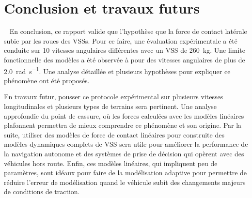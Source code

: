 \section{Conclusion et travaux futurs}~\label{sec:conclu}
En conclusion, ce rapport valide que l'hypothèse que la force de contact latérale subie par les roues des \acp{VSS}.
Pour ce faire, une évaluation expérimentale a été conduite sur 10 vitesses angulaires différentes avec un \ac{VSS} de \SI{260}{\kg}.
Une limite fonctionnelle des modèles a été observée à pour des vitesses angulaires de plus de \SI{2.0}{\radian\per\second}.
Une analyse détaillée et plusieurs hypothèses pour expliquer ce phénomène ont été proposés.

En travaux futur, pousser ce protocole expérimental sur plusieurs vitesses longitudinales et plusieurs types de terrains sera pertinent.
Une analyse approfondie du point de cassure, où les forces calculées avec les modèles linéaires plafonnent permettra de mieux comprendre ce phénomène et son origine.
Par la suite, utiliser des modèles de force de contact linéaires pour construite des modèles dynamiques complets de \ac{VSS} sera utile pour améliorer la performance de la navigation autonome et des systèmes de prise de décision qui opèrent avec des véhicules hors route.
Enfin, ces modèles linéaires, qui impliquent peu de paramètres, sont idéaux pour faire de la modélisation adaptive pour permettre de réduire l'erreur de modélisation quand le véhicule subit des changements majeurs de conditions de traction.